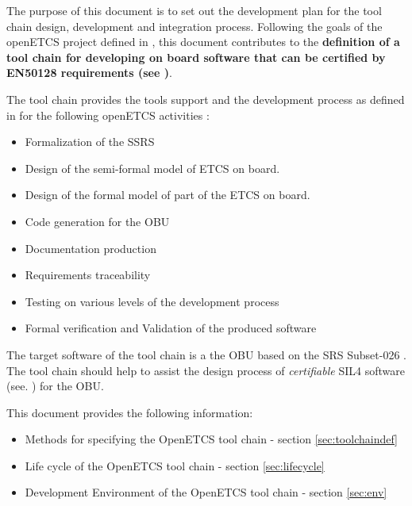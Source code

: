 The purpose of this document is to set out the development plan
for the tool chain design, development and integration process.
Following the goals of the openETCS project defined in \cite{FPP},
this document contributes to the {\bf definition of a tool chain 
 for developing on board  software that can be certified by EN50128
 requirements (see \cite{standard_railway_2011})}.

The tool chain provides the tools support and the development process as
defined in \cite{D2.6} for the following openETCS activities :
\begin{itemize}
\item Formalization of the \gls{SSRS} 
\item Design  of the semi-formal model of \gls{ETCS} on board.
\item Design of the formal model of part of the \gls{ETCS} on board.
\item Code generation for  the \gls{OBU}
\item Documentation production
\item Requirements traceability 
\item Testing on various levels of the development process
\item Formal verification and  Validation of the produced software

\end{itemize}

The target software of the tool chain is a the \gls{OBU} 
based on the \gls{SRS} Subset-026 \cite{unisig_subset-026_2012}.
The tool chain should help to assist the design process of {\em certifiable} \gls{SIL}4
software (see. \cite{D2.2}) for the \gls{OBU}. 

This document provides the following information:
\begin{itemize}
\item Methods for specifying the OpenETCS tool chain - section \ref{sec:toolchaindef}
\item Life cycle of the OpenETCS tool chain - section \ref{sec:lifecycle}
\item Development Environment of the OpenETCS tool chain - section \ref{sec:env}
\end{itemize}




